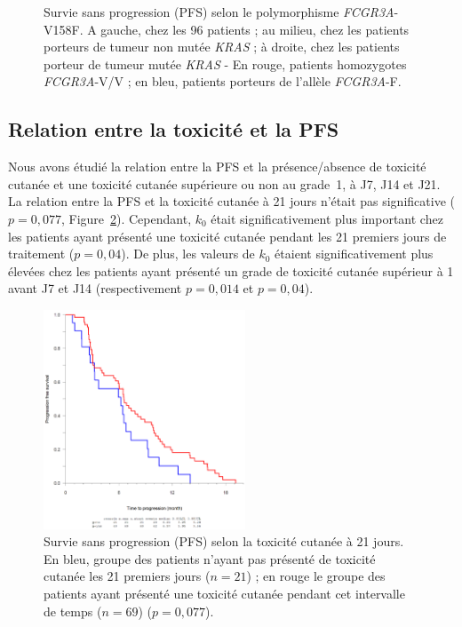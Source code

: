 \begin{figure}[htbp]
\begin{subfigure}[b]{0.33\linewidth}
  \end{subfigure} 
\caption{Survie sans progression (PFS) selon le polymorphisme \textit{FCGR3A}-V158F. A gauche, chez les 96 patients ; au milieu, chez les patients porteurs de tumeur non mutée \textit{KRAS} ; à droite, chez les patients porteur de tumeur mutée \textit{KRAS} - En rouge, patients homozygotes \textit{FCGR3A}-V/V ; en bleu, patients porteurs de l'allèle \textit{FCGR3A}-F.}
	\label{fig:27}
\end{figure}
\subsection{Relation entre la toxicité et la PFS}
Nous avons étudié la relation entre la PFS et la présence/absence de toxicité cutanée et une toxicité cutanée supérieure ou non au grade~1, à J7, J14 et J21. La relation entre la PFS et la toxicité cutanée à 21 jours n'était pas significative ($p = 0,077$, Figure~\ref{fig:28}).
Cependant, $k_0$ était significativement plus important chez les patients ayant présenté une toxicité cutanée pendant les 21 premiers jours de traitement ($p = 0,04$). De plus, les valeurs de $k_0$ étaient significativement plus élevées chez les patients ayant présenté un grade de toxicité cutanée supérieur à 1 avant J7 et J14 (respectivement $p = 0,014$ et $p = 0,04$).
\begin{figure}[htbp]
	\centering
		\includegraphics[width=6cm]{figures/raster/FIG_28}
	\caption{Survie sans progression (PFS) selon la toxicité cutanée à 21 jours. En bleu, groupe des patients n'ayant pas présenté de toxicité cutanée les 21 premiers jours ($n = 21$) ; en rouge le groupe des patients ayant présenté une toxicité cutanée pendant cet intervalle de temps ($n = 69$) ($p = 0,077$).}
	\label{fig:28}
\end{figure}
